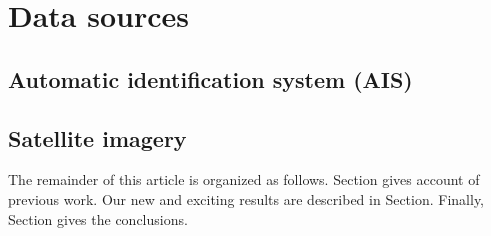 \section{Data sources}
\subsection{Automatic identification system (AIS)}
\subsection{Satellite imagery}
The remainder of this article is organized as follows.
Section gives account of previous work.
Our new and exciting results are described in Section.
Finally, Section gives the conclusions.
